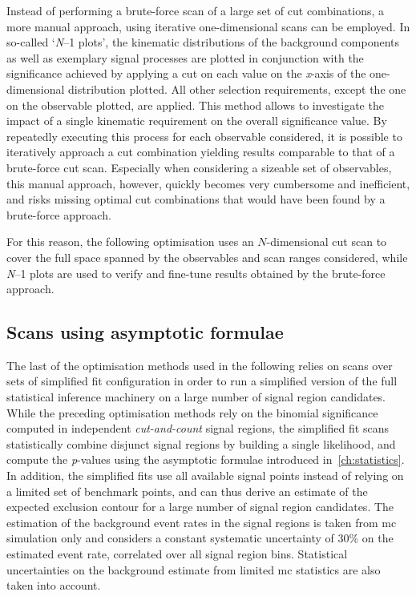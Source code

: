 Instead of performing a brute-force scan of a large set of cut combinations, a more manual approach, using iterative one-dimensional scans can be employed. In so-called `\textit{N}--1 plots', the kinematic distributions of the background components as well as exemplary signal processes are plotted in conjunction with the significance achieved by applying a cut on each value on the \textit{x}-axis of the one-dimensional distribution plotted. All other selection requirements, except the one on the observable plotted, are applied. This method allows to investigate the impact of a single kinematic requirement on the overall significance value. By repeatedly executing this process for each observable considered, it is possible to iteratively approach a cut combination yielding results comparable to that of a brute-force cut scan. Especially when considering a sizeable set of observables, this manual approach, however, quickly becomes very cumbersome and inefficient, and risks missing optimal cut combinations that would have been found by a brute-force approach.

For this reason, the following optimisation uses an $N$-dimensional cut scan to cover the full space spanned by the observables and scan ranges considered, while \textit{N}--1 plots are used to verify and fine-tune results obtained by the brute-force approach.

\subsection{Scans using asymptotic formulae}\label{sec:fit-scan}

The last of the optimisation methods used in the following relies on scans over sets of simplified fit configuration in order to run a simplified version of the full statistical inference machinery on a large number of signal region candidates.
While the preceding optimisation methods rely on the binomial significance computed in independent \textit{cut-and-count} signal regions, the simplified fit scans statistically combine disjunct signal regions by building a single likelihood, and compute the \textit{p}-values using the asymptotic formulae introduced in~\cref{ch:statistics}.
In addition, the simplified fits use all available signal points instead of relying on a limited set of benchmark points, and can thus derive an estimate of the expected exclusion contour for a large number of signal region candidates.
The estimation of the background event rates in the signal regions is taken from \gls{mc} simulation only and considers a constant systematic uncertainty of 30\% on the estimated event rate, correlated over all signal region bins. Statistical uncertainties on the background estimate from limited \gls{mc} statistics are also taken into account. 

